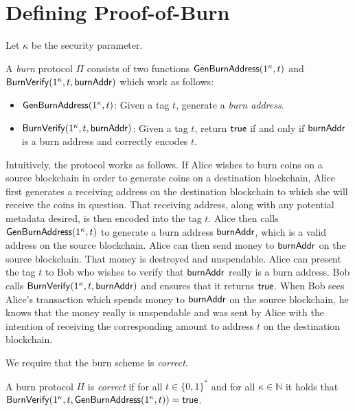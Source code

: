 \section{Defining Proof-of-Burn}

Let $\kappa$ be the security parameter.

\begin{definition}
  A \emph{burn} protocol $\Pi$ consists of two functions $\mathsf{Gen}\-\mathsf{Burn}\-\mathsf{Address}(1^\kappa, t)$ and $\mathsf{BurnVerify}(1^\kappa, t, \mathsf{burnAddr})$ which work as follows:

  \begin{itemize}
    \item $\mathsf{Gen}\-\mathsf{Burn}\-\mathsf{Address}(1^\kappa, t)$: Given a tag $t$, generate a \emph{burn address}.

    \item $\mathsf{BurnVerify}(1^\kappa, t, \mathsf{burnAddr})$: Given a tag $t$, return $\sf{true}$ if and only if $\mathsf{burnAddr}$ is a burn address and correctly encodes $t$.
  \end{itemize}
\end{definition}

Intuitively, the protocol works as follows. If Alice wishes to burn coins on a source blockchain in order to generate coins on a destination blockchain, Alice first generates a receiving address on the destination blockchain to which she will receive the coins in question. That receiving address, along with any potential metadata desired, is then encoded into the tag $t$. Alice then calls $\mathsf{Gen}\-\mathsf{Burn}\-\mathsf{Address}(1^\kappa, t)$ to generate a burn address $\mathsf{burnAddr}$, which is a valid address on the source blockchain. Alice can then send money to $\mathsf{burnAddr}$ on the source blockchain. That money is destroyed and unspendable. Alice can present the tag $t$ to Bob who wishes to verify that $\mathsf{burnAddr}$ really is a burn address. Bob calls $\mathsf{BurnVerify}(1^\kappa, t, \mathsf{burnAddr})$ and ensures that it returns $\mathsf{true}$. When Bob sees Alice's transaction which spends money to $\mathsf{burnAddr}$ on the source blockchain, he knows that the money really is unspendable and was sent by Alice with the intention of receiving the corresponding amount to address $t$ on the destination blockchain.

We require that the burn scheme is \emph{correct}.

\begin{definition}[Correctness]
  A burn protocol $\Pi$ is \emph{correct} if for all $t \in \{0,1\}^*$ and for all $\kappa \in \mathbb{N}$ it holds that
  $\mathsf{BurnVerify}(1^\kappa, t, \mathsf{Gen}\-\mathsf{Burn}\-\mathsf{Address}(1^\kappa, t)) = \mathsf{true}$.
\end{definition}

